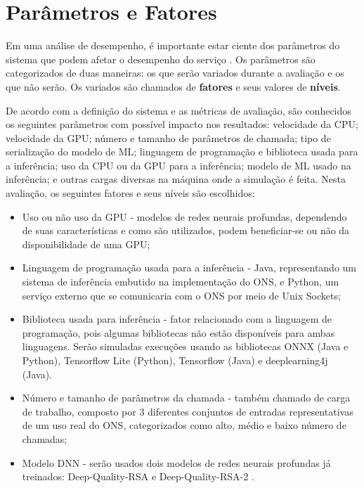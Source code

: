 \section{Parâmetros e Fatores}
\label{paramsfactors}

Em uma análise de desempenho, é importante estar ciente dos parâmetros do sistema que podem afetar o desempenho do serviço \cite{jain1991art}. Os parâmetros são categorizados de duas maneiras: os que serão variados durante a avaliação e os que não serão. Os variados são chamados de \textbf{fatores} e seus valores de \textbf{níveis}.

De acordo com a definição do sistema e as métricas de avaliação, são conhecidos os seguintes parâmetros com possível impacto nos resultados: velocidade da CPU; velocidade da GPU; número e tamanho de parâmetros de chamada; tipo de serialização do modelo de ML; linguagem de programação e biblioteca usada para a inferência; uso da CPU ou da GPU para a inferência; modelo de ML usado na inferência; e outras cargas diversas na máquina onde a simulação é feita. Nesta avaliação, os seguintes fatores e seus níveis são escolhidos:

\begin{itemize}
  \item Uso ou não uso da GPU - modelos de redes neurais profundas, dependendo de suas características e como são utilizados, podem beneficiar-se ou não da disponibilidade de uma GPU;
  \item Linguagem de programação usada para a inferência - Java, representando um sistema de inferência embutido na implementação do ONS, e Python, um serviço externo que se comunicaria com o ONS por meio de Unix Sockets; %
  \item Biblioteca usada para inferência - fator relacionado com a linguagem de programação, pois algumas bibliotecas não estão disponíveis para ambas linguagens. Serão simuladas execuções usando as bibliotecas ONNX \cite{onnx2019} (Java e Python), Tensorflow Lite (Python), Tensorflow (Java) e deeplearning4j \cite{deeplearning4j} (Java).
  \item Número e tamanho de parâmetros da chamada - também chamado de carga de trabalho, composto por 3 diferentes conjuntos de entradas representativas de um uso real do ONS, categorizados como alto, médio e baixo número de chamadas;
  \item Modelo DNN - serão usados dois modelos de redes neurais profundas já treinados: Deep-Quality-RSA \cite{deep_quality_rsa} e Deep-Quality-RSA-2 \cite{deep_quality_rsa}.
\end{itemize}

